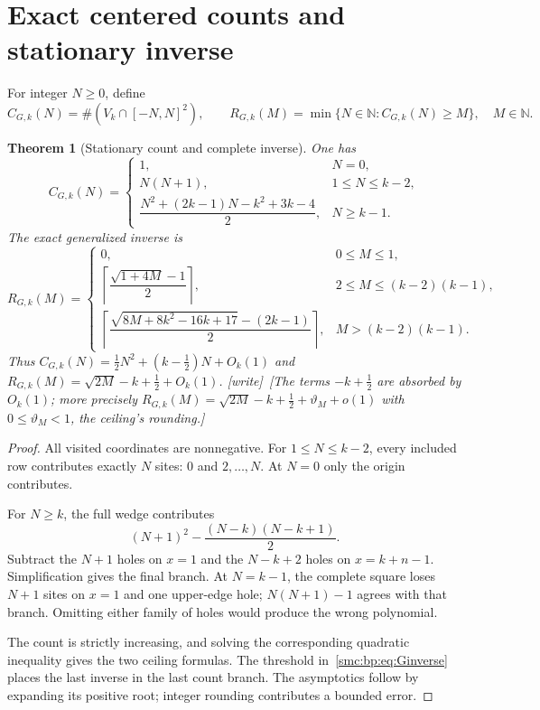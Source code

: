 \documentclass[11pt,letterpaper]{article}
\numberwithin{equation}{section}
\newtheorem{theorem}{Theorem}[section]
\theoremstyle{definition}
\theoremstyle{remark}
\newcommand{\NN}{\mathbb N}
\newcommand{\wtag}{\textup{[write]}}
\begin{document}
\section{Exact centered counts and stationary inverse}\label{smc:bp:sec:Gcount}
For integer $N\ge0$, define
\[
C_{G,k}(N)=\#(V_k\cap[-N,N]^2),\qquad
R_{G,k}(M)=\min\{N\in\NN:C_{G,k}(N)\ge M\},\quad M\in\NN.
\]
\begin{theorem}[Stationary count and complete inverse]\label{smc:bp:thm:Gcount}
One has
\begin{equation}\label{smc:bp:eq:Gcount}
C_{G,k}(N)=
\begin{cases}
1,&N=0,\\
N(N+1),&1\le N\le k-2,\\
\dfrac{N^2+(2k-1)N-k^2+3k-4}{2},&N\ge k-1.
\end{cases}
\end{equation}
The exact generalized inverse is
\begin{equation}\label{smc:bp:eq:Ginverse}
R_{G,k}(M)=
\begin{cases}
0,&0\le M\le1,\\
\left\lceil\dfrac{\sqrt{1+4M}-1}{2}\right\rceil,
&2\le M\le(k-2)(k-1),\\[5pt]
\left\lceil\dfrac{\sqrt{8M+8k^2-16k+17}-(2k-1)}{2}\right\rceil,
&M>(k-2)(k-1).
\end{cases}
\end{equation}
Thus $C_{G,k}(N)=\frac12N^2+(k-\frac12)N+O_k(1)$ and
$R_{G,k}(M)=\sqrt{2M}-k+\frac12+O_k(1)$. \wtag\ [The terms $-k+\frac12$ are absorbed by $O_k(1)$; more precisely $R_{G,k}(M)=\sqrt{2M}-k+\frac12+\vartheta_M+o(1)$ with $0\le\vartheta_M<1$, the ceiling's rounding.]
\end{theorem}
\begin{proof}
All visited coordinates are nonnegative. For $1\le N\le k-2$, every included row contributes exactly $N$ sites: $0$ and $2,\ldots,N$. At $N=0$ only the origin contributes.

For $N\ge k$, the full wedge contributes
\[
(N+1)^2-\frac{(N-k)(N-k+1)}2.
\]
Subtract the $N+1$ holes on $x=1$ and the $N-k+2$ holes on $x=k+n-1$. Simplification gives the final branch. At $N=k-1$, the complete square loses $N+1$ sites on $x=1$ and one upper-edge hole; $N(N+1)-1$ agrees with that branch. Omitting either family of holes would produce the wrong polynomial.

The count is strictly increasing, and solving the corresponding quadratic inequality gives the two ceiling formulas. The threshold in~\eqref{smc:bp:eq:Ginverse} places the last inverse in the last count branch. The asymptotics follow by expanding its positive root; integer rounding contributes a bounded error.
\end{proof}
\end{document}
